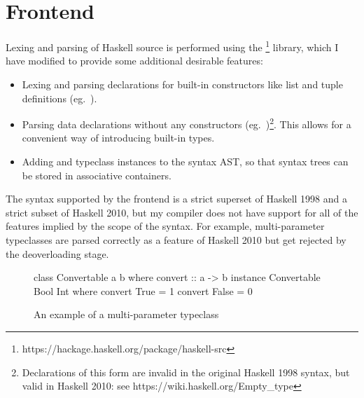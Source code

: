 \documentclass[dissertation.tex]{subfiles}
\begin{document}
\section{Frontend}
{

    Lexing and parsing of Haskell source is performed using the
    \footnote{https://hackage.haskell.org/package/haskell-src} library, which I have modified to
    provide some additional desirable features:

    \begin{itemize}
    \item
    {
        Lexing and parsing declarations for built-in constructors like list and tuple definitions (eg.\ ).
    }
    \item
    {

        Parsing data declarations without any constructors (eg.\ )\footnote{Declarations of this form
        are invalid in the original Haskell 1998 syntax, but valid in Haskell 2010: see
        https://wiki.haskell.org/Empty\_type}. This allows for a convenient way of introducing built-in types.

    }
    \item
    {

        Adding  and  typeclass instances to the syntax AST, so that syntax trees can be
        stored in associative containers.

    }
    \end{itemize}

    The syntax supported by the frontend is a strict superset of Haskell 1998 and a strict subset of Haskell 2010, but
    my compiler does not have support for all of the features implied by the scope of the syntax. For example,
    multi-parameter typeclasses are parsed correctly as a feature of Haskell 2010 but get rejected by the deoverloading
    stage.

    \begin{figure}[h]
        \begin{haskellfigure}
        class Convertable a b where
            convert :: a -> b
        instance Convertable Bool Int where
            convert True = 1
            convert False = 0
        \end{haskellfigure}
        \caption{An example of a multi-parameter typeclass}
    \end{figure}

}
\end{document}
